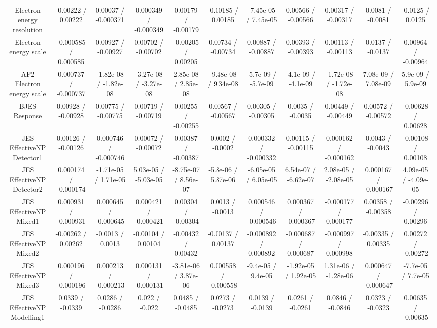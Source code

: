 \begin{table}[htbp]
\begin{center}
\begin{tabular}{|c|c|c|c|c|c|c|c|c|c|c|}
  Electron energy resolution & -0.00222 / 0.00222 & 0.00037 / -0.000371 & 0.000349 / -0.000349 & 0.00179 / -0.00179 & -0.00185 / 0.00185 & -7.45e-05 / 7.45e-05 & 0.00566 / -0.00566 & 0.00317 / -0.00317 & 0.0081 / -0.0081 & -0.0125 / 0.0125 \\ 
  Electron energy scale & -0.000585 / 0.000585 & 0.00927 / -0.00927 & 0.00702 / -0.00702 & -0.00205 / 0.00205 & 0.00734 / -0.00734 & 0.00887 / -0.00887 & 0.00393 / -0.00393 & 0.00113 / -0.00113 & 0.0137 / -0.0137 & 0.00964 / -0.00964 \\ 
  AF2 Electron energy scale & 0.000737 / -0.000737 & -1.82e-08 / -1.82e-08 & -3.27e-08 / -3.27e-08 & 2.85e-08 / 2.85e-08 & -9.48e-08 / 9.34e-08 & -5.7e-09 / -5.7e-09 & -4.1e-09 / -4.1e-09 & -1.72e-08 / -1.72e-08 & 7.08e-09 / 7.08e-09 & 5.9e-09 / 5.9e-09 \\ 
  BJES Response & 0.00928 / -0.00928 & 0.00775 / -0.00775 & 0.00719 / -0.00719 & 0.00255 / -0.00255 & 0.00567 / -0.00567 & 0.00305 / -0.00305 & 0.0035 / -0.0035 & 0.00449 / -0.00449 & 0.00572 / -0.00572 & -0.00628 / 0.00628 \\ 
  JES EffectiveNP Detector1 & 0.00126 / -0.00126 & 0.000746 / -0.000746 & 0.00072 / -0.00072 & 0.00387 / -0.00387 & 0.0002 / -0.0002 & 0.000332 / -0.000332 & 0.00115 / -0.00115 & 0.000162 / -0.000162 & 0.0043 / -0.0043 & -0.00108 / 0.00108 \\ 
  JES EffectiveNP Detector2 & 0.000174 / -0.000174 & -1.71e-05 / 1.71e-05 & 5.03e-05 / -5.03e-05 & -8.75e-07 / 8.56e-07 & -5.8e-06 / 5.87e-06 & -6.05e-05 / 6.05e-05 & 6.54e-07 / -6.62e-07 & 2.08e-05 / -2.08e-05 & 0.000167 / -0.000167 & 4.09e-05 / -4.09e-05 \\ 
  JES EffectiveNP Mixed1 & 0.000931 / -0.000931 & 0.000645 / -0.000645 & 0.000421 / -0.000421 & 0.00304 / -0.00304 & 0.0013 / -0.0013 & 0.000546 / -0.000546 & 0.000367 / -0.000367 & -0.000177 / 0.000177 & 0.00358 / -0.00358 & -0.00296 / 0.00296 \\ 
  JES EffectiveNP Mixed2 & -0.00262 / 0.00262 & -0.0013 / 0.0013 & -0.00104 / 0.00104 & -0.00432 / 0.00432 & -0.00137 / 0.00137 & -0.000892 / 0.000892 & -0.000687 / 0.000687 & -0.000997 / 0.000998 & -0.00335 / 0.00335 & 0.00272 / -0.00272 \\ 
  JES EffectiveNP Mixed3 & 0.000196 / -0.000196 & 0.000213 / -0.000213 & 0.000131 / -0.000131 & -3.81e-06 / 3.87e-06 & 0.000558 / -0.000558 & -9.4e-05 / 9.4e-05 & -1.92e-05 / 1.92e-05 & 1.31e-06 / -1.28e-06 & 0.000647 / -0.000647 & -7.7e-05 / 7.7e-05 \\ 
  JES EffectiveNP Modelling1 & 0.0339 / -0.0339 & 0.0286 / -0.0286 & 0.022 / -0.022 & 0.0485 / -0.0485 & 0.0273 / -0.0273 & 0.0139 / -0.0139 & 0.0261 / -0.0261 & 0.0846 / -0.0846 & 0.0323 / -0.0323 & 0.00635 / -0.00635 \\ 

\end{tabular}
\end{center}
\end{table}
